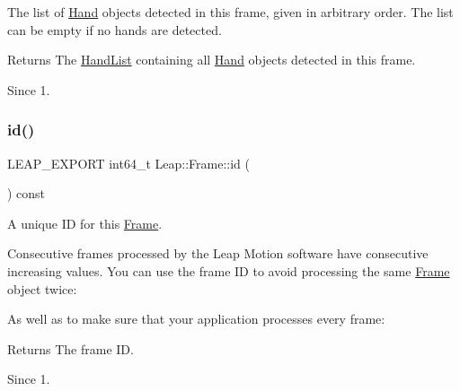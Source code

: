 The list of \hyperlink{class_leap_1_1_hand}{Hand} objects detected in this frame, given in arbitrary order. The list can be empty if no hands are detected.


\begin{DoxyCodeInclude}
\end{DoxyCodeInclude}


\begin{DoxyReturn}{Returns}
The \hyperlink{class_leap_1_1_hand_list}{Hand\+List} containing all \hyperlink{class_leap_1_1_hand}{Hand} objects detected in this frame. 
\end{DoxyReturn}
\begin{DoxySince}{Since}
1. 
\end{DoxySince}
\mbox{\label{class_leap_1_1_frame_aac6e1192b900d50c42b3152bb059767f}} 
\subsubsection{\texorpdfstring{id()}{id()}}
{\footnotesize\ttfamily L\+E\+A\+P\+\_\+\+E\+X\+P\+O\+RT int64\+\_\+t Leap\+::\+Frame\+::id (\begin{DoxyParamCaption}{ }\end{DoxyParamCaption}) const}

A unique ID for this \hyperlink{class_leap_1_1_frame}{Frame}.

Consecutive frames processed by the Leap Motion software have consecutive increasing values. You can use the frame ID to avoid processing the same \hyperlink{class_leap_1_1_frame}{Frame} object twice\+:


\begin{DoxyCodeInclude}
\end{DoxyCodeInclude}


As well as to make sure that your application processes every frame\+:


\begin{DoxyCodeInclude}
\end{DoxyCodeInclude}


\begin{DoxyReturn}{Returns}
The frame ID. 
\end{DoxyReturn}
\begin{DoxySince}{Since}
1. 
\end{DoxySince}
\mbox{\label{class_leap_1_1_frame_a64839985307492bf124b72ea13b1f2cf}} 
